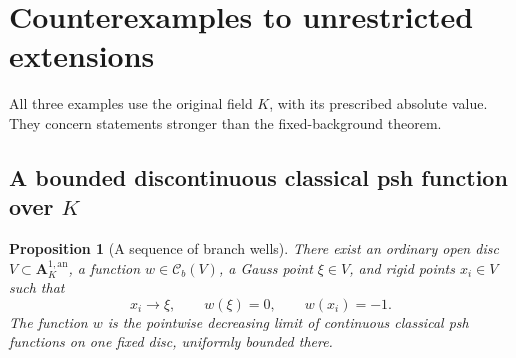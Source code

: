 \documentclass[11pt,a4paper]{article}
\numberwithin{equation}{section}
\newtheorem{proposition}[theorem]{Proposition}
\theoremstyle{definition}
\theoremstyle{remark}
\begin{document}


\section{Counterexamples to unrestricted extensions}
\label{sec:counterexamples}

All three examples use the original field \(K\), with its prescribed
absolute value. They concern statements stronger than the fixed-background
theorem.

\subsection{A bounded discontinuous classical psh function over \texorpdfstring{$K$}{K}}

\begin{proposition}[A sequence of branch wells]
\label{prop:branch-wells}
There exist an ordinary open disc \(V\subset\mathbf A_K^{1,\mathrm{an}}\), a
function \(w\in\mathcal C_b(V)\), a Gauss point \(\xi\in V\), and rigid
points \(x_i\in V\) such that
\[
 x_i\longrightarrow\xi,\qquad w(\xi)=0,\qquad w(x_i)=-1.
\]
The function \(w\) is the pointwise decreasing limit of continuous classical
psh functions on one fixed disc, uniformly bounded there.
\end{proposition}
\end{document}
